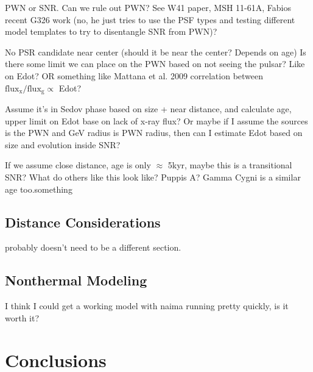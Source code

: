 PWN or SNR. Can we rule out PWN? See W41 paper, MSH 11-61A, Fabios recent G326 work (no, he just tries to use the PSF types and testing different model templates to try to disentangle SNR from PWN)?

No PSR candidate near center (should it be near the center? Depends on age)
Is there some limit we can place on the PWN based on not seeing the pulsar? Like on Edot? OR something like Mattana et al. 2009 correlation between  $\mathrm{flux_x / flux_g \propto}$   Edot? 

Assume it's in Sedov phase based on size + near distance, and calculate age, upper limit on Edot base on lack of x-ray flux? Or maybe if I assume the sources is the PWN and GeV radius is PWN radius, then can I estimate Edot based on size and evolution inside  SNR?

If we assume close distance, age is only $\approx$ 5kyr, maybe this is a transitional SNR? What do others like this look like? Puppis A? Gamma Cygni is a similar age too.something 


\subsection{\label{sec:Dist}Distance Considerations}
probably doesn't need to be a different section. 
\subsection{\label{secModel}Nonthermal Modeling}
I think I could get a working model with naima running pretty quickly, is it worth it?
%
%
\section{\label{sec:Conc}Conclusions}